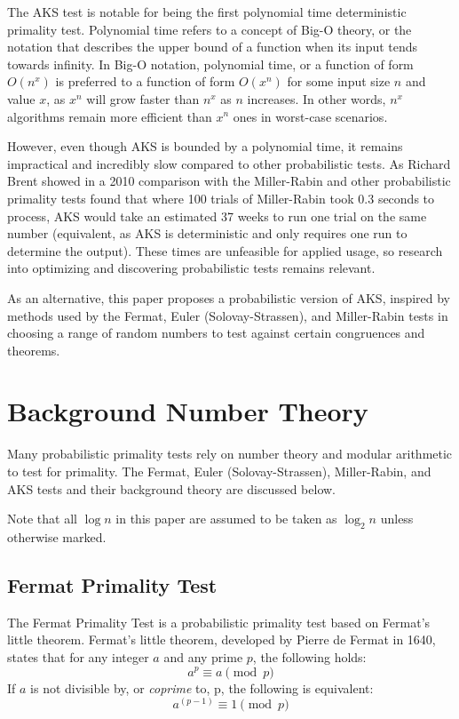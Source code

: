 \documentclass{article}
\begin{document}
The AKS test is notable for being the first polynomial time deterministic primality test. Polynomial time refers to a concept of Big-O theory, or the notation that describes the upper bound of a function when its input tends towards infinity. In Big-O notation, polynomial time, or a function of form $O(n^x)$ is preferred to a function of form $O(x^n)$ for some input size $n$ and value $x$, as $x^n$ will grow faster than $n^x$ as $n$ increases. In other words, $n^x$ algorithms remain more efficient than $x^n$ ones in worst-case scenarios. 

However, even though AKS is bounded by a polynomial time, it remains impractical and incredibly slow compared to other probabilistic tests. As Richard Brent showed in a 2010 comparison with the Miller-Rabin and other probabilistic primality tests found that where 100 trials of Miller-Rabin took 0.3 seconds to process, AKS would take an estimated 37 weeks to run one trial on the same number (equivalent, as AKS is deterministic and only requires one run to determine the output). These times are unfeasible for applied usage, so research into optimizing and discovering probabilistic tests remains relevant.

As an alternative, this paper proposes a probabilistic version of AKS, inspired by methods used by the Fermat, Euler (Solovay-Strassen), and Miller-Rabin tests in choosing a range of random numbers to test against certain congruences and theorems.

\section{Background Number Theory}

Many probabilistic primality tests rely on number theory and modular arithmetic to test for primality. The Fermat, Euler (Solovay-Strassen), Miller-Rabin, and AKS tests and their background theory are discussed below.

Note that all $\log{n}$ in this paper are assumed to be taken as $\log_{2}{n}$ unless otherwise marked.

\subsection{Fermat Primality Test}
The Fermat Primality Test is a probabilistic primality test based on Fermat's little theorem.
Fermat's little theorem, developed by Pierre de Fermat in 1640, states that for any integer $a$ and any prime $p$, the following holds:
\[
    a^p \equiv a \pmod{p} 
\]
If $a$ is not divisible by, or \emph{coprime} to, p, the following is equivalent:
\[
    a^{(p - 1)} \equiv 1 \pmod{p} 
\]
\end{document}
